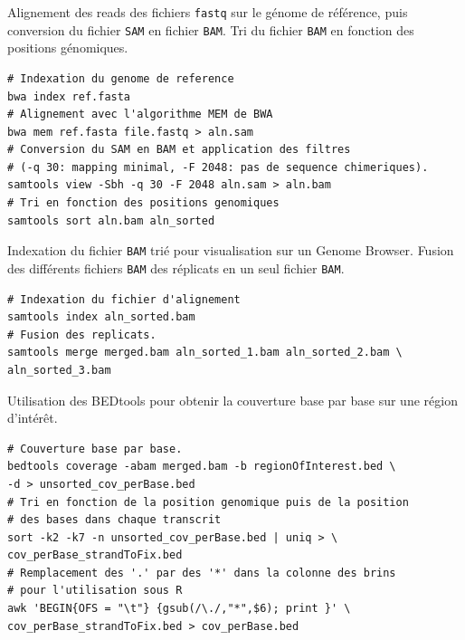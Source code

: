 \documentclass[12pt,a4paper]{report}
\begin{document}
Alignement des reads des fichiers \texttt{fastq} sur le génome de référence, puis conversion du fichier \texttt{SAM} en fichier \texttt{BAM}. Tri du fichier \texttt{BAM} en fonction des positions génomiques. 
\begin{lstlisting}[frame=single]
# Indexation du genome de reference
bwa index ref.fasta
# Alignement avec l'algorithme MEM de BWA
bwa mem ref.fasta file.fastq > aln.sam
# Conversion du SAM en BAM et application des filtres
# (-q 30: mapping minimal, -F 2048: pas de sequence chimeriques).
samtools view -Sbh -q 30 -F 2048 aln.sam > aln.bam
# Tri en fonction des positions genomiques
samtools sort aln.bam aln_sorted
\end{lstlisting}

Indexation du fichier \texttt{BAM} trié pour visualisation sur un Genome Browser. Fusion des différents fichiers \texttt{BAM} des réplicats en un seul fichier \texttt{BAM}.
\begin{lstlisting}[frame=single]
# Indexation du fichier d'alignement
samtools index aln_sorted.bam
# Fusion des replicats.
samtools merge merged.bam aln_sorted_1.bam aln_sorted_2.bam \
aln_sorted_3.bam
\end{lstlisting}

Utilisation des BEDtools pour obtenir la couverture base par base sur une région d'intérêt.
\lstset{language=sh, commentstyle=\color{ForestGreen}}  
\begin{lstlisting}[frame=single]
# Couverture base par base.
bedtools coverage -abam merged.bam -b regionOfInterest.bed \
-d > unsorted_cov_perBase.bed
# Tri en fonction de la position genomique puis de la position 
# des bases dans chaque transcrit
sort -k2 -k7 -n unsorted_cov_perBase.bed | uniq > \
cov_perBase_strandToFix.bed
# Remplacement des '.' par des '*' dans la colonne des brins 
# pour l'utilisation sous R
awk 'BEGIN{OFS = "\t"} {gsub(/\./,"*",$6); print }' \
cov_perBase_strandToFix.bed > cov_perBase.bed
\end{lstlisting}
\end{document}
